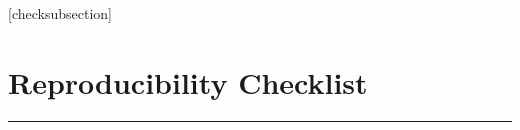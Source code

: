 \documentclass[letterpaper]{article}
\begin{document}
\fi
\setlength{\leftmargini}{20pt}
\makeatletter\def\@listi{\leftmargin\leftmargini \topsep .5em \parsep .5em \itemsep .5em}
\def\@listii{\leftmargin\leftmarginii \labelwidth\leftmarginii \advance\labelwidth-\labelsep \topsep .4em \parsep .4em \itemsep .4em}
\def\@listiii{\leftmargin\leftmarginiii \labelwidth\leftmarginiii \advance\labelwidth-\labelsep \topsep .4em \parsep .4em \itemsep .4em}\makeatother

\setcounter{secnumdepth}{0}
\renewcommand\thesubsection{\arabic{subsection}}
\renewcommand\labelenumi{\thesubsection.\arabic{enumi}}

[checksubsection]

\newcommand{\checksubsection}[1]{%
  \refstepcounter{checksubsection}%
  \paragraph{\arabic{checksubsection}. #1}%
  \setcounter{checkitem}{0}%
}

\newcommand{\checkitem}{%
  \refstepcounter{checkitem}%
  \item[\arabic{checksubsection}.\arabic{checkitem}.]%
}
\newcommand{\question}[2]{\normalcolor\checkitem #1 #2 \color{blue}}
\newcommand{\ifyespoints}[1]{\makebox[0pt][l]{\hspace{-15pt}\normalcolor #1}}

\section*{Reproducibility Checklist}

\vspace{1em}
\hrule
\vspace{1em}

\end{document}
